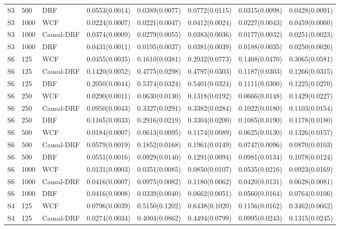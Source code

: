 \begin{longtable}{lllrrrrr}
S3 & 500 & DRF & 0.0553(0.0014) & 0.0389(0.0077) & 0.0772(0.0115) & 0.0315(0.0098) & 0.0428(0.0091) \\
\addlinespace
S3 & 1000 & WCF & 0.0224(0.0007) & 0.0221(0.0047) & 0.0412(0.0024) & 0.0227(0.0043) & 0.0459(0.0060) \\
S3 & 1000 & Causal-DRF & 0.0374(0.0009) & 0.0279(0.0055) & 0.0383(0.0036) & 0.0177(0.0032) & 0.0251(0.0023) \\
S3 & 1000 & DRF & 0.0431(0.0011) & 0.0195(0.0037) & 0.0381(0.0039) & 0.0188(0.0035) & 0.0250(0.0026) \\
\addlinespace
\midrule
S6 & 125 & WCF & 0.0455(0.0035) & 0.1610(0.0381) & 0.2932(0.0773) & 0.1468(0.0470) & 0.3065(0.0581) \\
S6 & 125 & Causal-DRF & 0.1420(0.0052) & 0.4775(0.0298) & 0.4797(0.0303) & 0.1187(0.0303) & 0.1266(0.0315) \\
S6 & 125 & DRF & 0.2050(0.0044) & 0.5374(0.0324) & 0.5401(0.0324) & 0.1111(0.0300) & 0.1225(0.0270) \\
\addlinespace
S6 & 250 & WCF & 0.0290(0.0011) & 0.0630(0.0130) & 0.1318(0.0192) & 0.0666(0.0148) & 0.1429(0.0227) \\
S6 & 250 & Causal-DRF & 0.0950(0.0043) & 0.3327(0.0291) & 0.3382(0.0284) & 0.1022(0.0180) & 0.1103(0.0154) \\
S6 & 250 & DRF & 0.1165(0.0033) & 0.2916(0.0219) & 0.3304(0.0200) & 0.1085(0.0190) & 0.1178(0.0180) \\
\addlinespace
S6 & 500 & WCF & 0.0184(0.0007) & 0.0613(0.0095) & 0.1174(0.0089) & 0.0625(0.0130) & 0.1326(0.0157) \\
S6 & 500 & Causal-DRF & 0.0579(0.0019) & 0.1852(0.0168) & 0.1961(0.0149) & 0.0747(0.0096) & 0.0870(0.0103) \\
S6 & 500 & DRF & 0.0551(0.0016) & 0.0929(0.0140) & 0.1291(0.0094) & 0.0981(0.0134) & 0.1078(0.0124) \\
\addlinespace
S6 & 1000 & WCF & 0.0131(0.0003) & 0.0351(0.0085) & 0.0850(0.0107) & 0.0535(0.0216) & 0.0923(0.0169) \\
S6 & 1000 & Causal-DRF & 0.0416(0.0007) & 0.0975(0.0082) & 0.1180(0.0062) & 0.0420(0.0131) & 0.0628(0.0081) \\
S6 & 1000 & DRF & 0.0416(0.0008) & 0.0339(0.0040) & 0.0662(0.0051) & 0.0560(0.0164) & 0.0764(0.0106) \\
\addlinespace
\midrule
S4 & 125 & WCF & 0.0796(0.0039) & 0.5150(0.1202) & 0.6438(0.1020) & 0.1156(0.0162) & 0.3462(0.0662) \\
S4 & 125 & Causal-DRF & 0.0274(0.0034) & 0.4004(0.0862) & 0.4494(0.0799) & 0.0995(0.0243) & 0.1315(0.0245) \\

\end{longtable}
